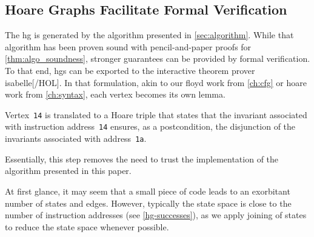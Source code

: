 \subsection{Hoare Graphs Facilitate Formal Verification}
The \gls{hg} is generated by the algorithm presented in \cref{sec:algorithm}.
While that algorithm has been proven sound with pencil-and-paper proofs for \cref{thm:algo_soundness}, stronger guarantees can be provided by formal verification.
To that end, \glspl{hg} can be exported to the interactive theorem prover \gls{isabelle}[/HOL].
In that formulation, akin to our \gls{floyd} work from \cref{ch:cfg} or \gls{hoare} work from \cref{ch:syntax}, each vertex becomes its own lemma.
\begin{example}
  Vertex~\texttt{14} is translated to a Hoare triple that states that the invariant associated with instruction address~\texttt{14} ensures, as a postcondition, the disjunction of the invariants associated with address~\texttt{1a}.
\end{example}
Essentially, this step removes the need to trust the implementation of the algorithm presented in this paper.

At first glance, it may seem that a small piece of code leads to an exorbitant number of states and edges.
However, typically the state space is close to the number of instruction addresses (see \cref{hg-successes}), as
we apply joining of states to reduce the state space whenever possible.

\begin{comment}
  \section{Summary}
  This \lcnamecref{ch:hg-lifting} provided an introduction to \glspl{hg}, the motivation for their development, and a small example explaining their usage.
\end{comment}
